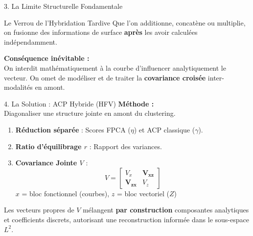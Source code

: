 \documentclass[10pt, compress]{beamer}
\begin{document}
\begin{frame}{3. La Limite Structurelle Fondamentale}

\vspace{2em}
\begin{alertblock}{Le Verrou de l'Hybridation Tardive}
Que l'on additionne, concatène ou multiplie, on fusionne des informations de surface \textbf{après} les avoir calculées indépendamment. 
\end{alertblock}

\vspace{1em}
\textbf{Conséquence inévitable :}\\
On interdit mathématiquement à la courbe d'influencer analytiquement le vecteur. On omet de modéliser et de traiter la \textbf{covariance croisée} inter-modalités en amont.
\end{frame}

\begin{frame}{4. La Solution : ACP Hybride (HFV)}
\textbf{Méthode :}\\
Diagonaliser une structure jointe en amont du clustering.

\begin{enumerate}
    \item \textbf{Réduction séparée} : Scores FPCA ($\eta$) et ACP classique ($\gamma$).
    \item \textbf{Ratio d'équilibrage $r$} : Rapport des variances.
    \item \textbf{Covariance Jointe $V$} :
    \[
      V = \begin{bmatrix} V_x & \mathbf{V_{xz}} \\ \mathbf{V_{zx}} & V_z \end{bmatrix}
    \]
    {\small $x$ = bloc fonctionnel (courbes), \quad $z$ = bloc vectoriel ($Z$)}
\end{enumerate}

\vspace{0.5em}
Les vecteurs propres de $V$ mélangent \textbf{par construction} composantes analytiques et coefficients discrets, autorisant une reconstruction informée dans le sous-espace $L^2$.
\end{frame}
\end{document}
